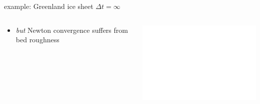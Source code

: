 \documentclass[hide notes,intlimits,usenames,dvipsnames]{beamer}
\begin{document}
\begin{frame}{example: Greenland ice sheet $\Delta t=\infty$}
\begin{columns}
\begin{column}{0.5\textwidth}
\begin{itemize}
\bigskip
\item<2> \emph{but} Newton convergence suffers from bed roughness
\end{itemize}
\end{column}
\begin{column}{0.5\textwidth}

\includegraphics<2>[width=\textwidth]{rseps.pdf}
\end{column}
\end{columns}
\end{frame}
\end{document}
